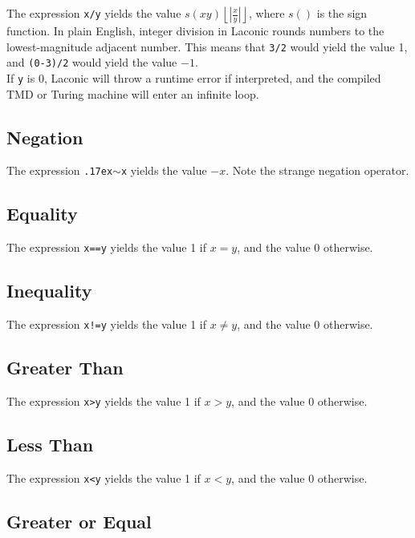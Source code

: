 \documentclass[11pt]{article}
\begin{document}
The expression \texttt{x/y} yields the value $s(xy)\left\lfloor|\frac{x}{y}|\right\rfloor$, where $s()$ is the sign function. In plain English, integer division in Laconic rounds numbers to the lowest-magnitude adjacent number. This means that \texttt{3/2} would yield the value 1, and \texttt{(0-3)/2} would yield the value $-1$. \\

If \texttt{y} is 0, Laconic will throw a runtime error if interpreted, and the compiled TMD or Turing machine will enter an infinite loop.

\subsection{Negation}

The expression \texttt{{\raise.17ex\hbox{$\scriptstyle\sim$}}x} yields the value $-x$. Note the strange negation operator.

\subsection{Equality}

The expression \texttt{x==y} yields the value 1 if $x=y$, and the value 0 otherwise.

\subsection{Inequality}

The expression \texttt{x!=y} yields the value 1 if $x\not=y$, and the value 0 otherwise.

\subsection{Greater Than}

The expression \texttt{x>y} yields the value 1 if $x>y$, and the value 0 otherwise.

\subsection{Less Than}

The expression \texttt{x<y} yields the value 1 if $x<y$, and the value 0 otherwise.

\subsection{Greater or Equal}
\end{document}
